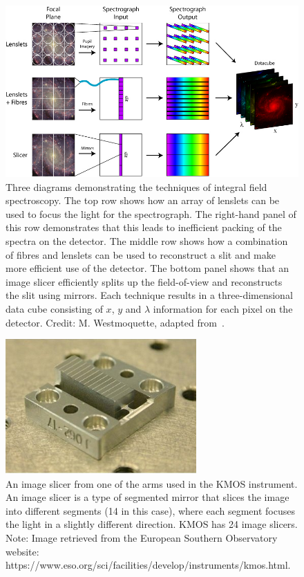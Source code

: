 \begin{figure}
 \centering
 \includegraphics[width=\textwidth]{kmos/ifu_designs}
 \caption[Integral field spectroscopic methods]{Three diagrams demonstrating the techniques of integral field spectroscopy.
 The top row shows how an array of lenslets can be used to focus the light for the spectrograph. The right-hand panel of this row demonstrates that this leads to inefficient packing of the spectra on the detector.
 The middle row shows how a combination of fibres and lenslets can be used to reconstruct a slit and make more efficient use of the detector.
 The bottom panel shows that an image slicer efficiently splits up the field-of-view and reconstructs the slit using mirrors.
 Each technique results in a three-dimensional data cube consisting of $x$, $y$ and $\lambda$ information for each pixel on the detector.
 Credit: M. Westmoquette, adapted from~\citep{2006NewAR..50..244A}.
 \label{fig:IFS}}
\end{figure}

\begin{figure}
 \centering
 \includegraphics[width=0.65\textwidth]{kmos/kmos-image-slicer}
 \caption[A KMOS image slicer]{An image slicer from one of the arms used in the KMOS instrument.
 An image slicer is a type of segmented mirror that slices the image into different segments (14 in this case), where each segment focuses the light in a slightly different direction.
 KMOS has 24 image slicers.
 Note: Image retrieved from the European Southern Observatory website: https://www.eso.org/sci/facilities/develop/instruments/kmos.html.
 \label{fig:image_slicer}}
\end{figure}


